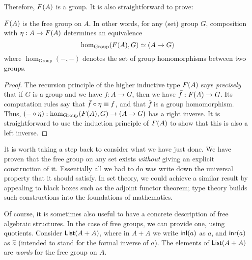 Therefore, $F(A)$ is a group.
It is also straightforward to prove:

\begin{thm}
  $F(A)$ is the free group on $A$.
  In other words, for any (set) group $G$, composition with $\eta:A\to F(A)$ determines an equivalence
  \[ \hom_{\mathrm{Group}}(F(A),G) \simeq (A\to G) \]
  where $\hom_{\mathrm{Group}}(-,-)$ denotes the set of group homomorphisms between two groups.
\end{thm}
\begin{proof}
  The recursion principle of the higher inductive type $F(A)$ says \emph{precisely} that if $G$ is a group and we have $f:A\to G$, then we have $\bar{f}:F(A) \to G$.
  Its computation rules say that $\bar{f}\circ \eta \equiv f$, and that $\bar f$ is a group homomorphism.
  Thus, $(-\circ \eta) :  \hom_{\mathrm{Group}}(F(A),G) \to (A\to G)$ has a right inverse.
  It is straightforward to use the induction principle of $F(A)$ to show that this is also a left inverse.
\end{proof}

It is worth taking a step back to consider what we have just done.
We have proven that the free group on any set exists \emph{without} giving an explicit construction of it.
Essentially all we had to do was write down the universal property that it should satisfy.
In set theory, we could achieve a similar result by appealing to black boxes such as the adjoint functor theorem; type theory builds such constructions into the foundations of mathematics.

Of course, it is sometimes also useful to have a concrete description of free algebraic structures.
In the case of free groups, we can provide one, using quotients.
Consider $\mathsf{List}(A+A)$, where in $A+A$ we write ${\mathsf{inl}}(a)$ as $a$, and ${\mathsf{inr}}(a)$ as $\hat{a}$ (intended to stand for the formal inverse of $a$).
The elements of $\mathsf{List}(A+A)$ are \emph{words} for the free group on $A$.

